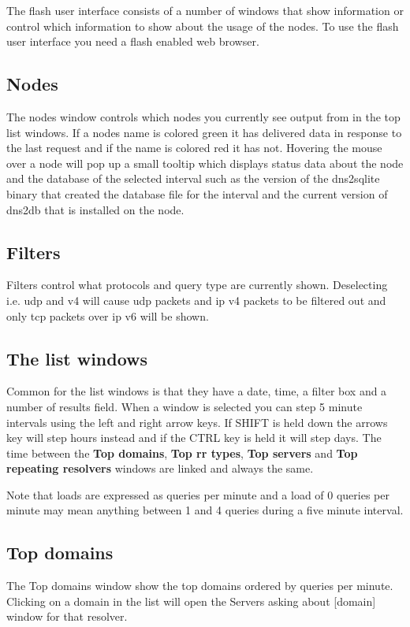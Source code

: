 \documentclass[a4paper]{article}
\begin{document}
The flash user interface consists of a number of windows that show 
information or control which information to show about the usage of the nodes.
To use the flash user interface you need a flash enabled web browser. 

\subsection{Nodes}
The nodes window controls which nodes you currently see output 
from in the top list windows.
If a nodes name is colored green it has delivered data in response 
to the last request and if the name is colored red it has not.
Hovering the mouse over a node will pop up a small tooltip which displays status 
data about the node and the database of the selected interval such as the version 
of the dns2sqlite binary that created the database file for the interval and 
the current version of dns2db that is installed on the node.

\subsection{Filters}
Filters control what protocols and query type are currently shown. Deselecting i.e. 
udp and v4 will cause udp packets and ip v4 packets to be filtered out 
and only tcp packets over ip v6 will be shown.

\subsection{The list windows}
Common for the list windows is that they have a date, time, a filter box and a 
number of results field.
When a window is selected you can step 5 minute intervals using the left and 
right arrow keys. If SHIFT is held down the arrows key will step hours instead 
and if the CTRL key is held it will step days.
The time between the \textbf{Top domains}, \textbf{Top rr types}, 
\textbf{Top servers} and \textbf{Top repeating resolvers} windows are 
linked and always the same.

Note that loads are expressed as queries per minute and a load of 0 queries per 
minute may mean anything between 1 and 4 queries during a five minute interval.


\subsection{Top domains}
The Top domains window show the top domains ordered by queries per minute. 
Clicking on a domain in the list will open the Servers asking about [domain] 
window for that resolver.
\end{document}
